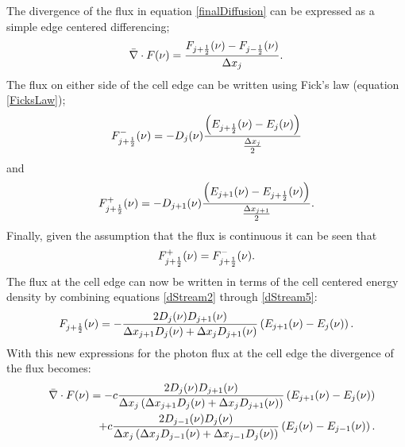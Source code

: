 	The divergence of the flux in equation \ref{finalDiffusion} can be expressed as a simple edge centered differencing;
	\begin{equation}
	\label{dStream}
	\bar{\nabla}\cdot{F(\nu)}={F_{j+{1\over{2}}}(\nu)-F_{j-{1\over{2}}}(\nu)\over{\Delta{x_j}}}.
	\end{equation}
	The flux on either side of the cell edge can be written using Fick's law (equation \ref{FicksLaw});
	\begin{equation}
	\label{dStream2}
	F_{j+{1\over{2}}}^-(\nu)=-D_{j}(\nu){\left(E_{j+{1\over{2}}}(\nu)-E_j(\nu)\right)\over{{\Delta{x_{j}}\over{2}}}}
	\end{equation}
	and
	\begin{equation}
	\label{dStream3}
	F_{j+{1\over{2}}}^+(\nu)=-D_{j+1}(\nu){\left(E_{j+1}(\nu)-E_{j+{1\over{2}}}(\nu)\right)\over{{\Delta{x_{j+1}}\over{2}}}}.
	\end{equation}
	Finally, given the assumption that the flux is continuous it can be seen that
	\begin{equation}
	\label{dStream5}
	F_{j+{1\over{2}}}^+(\nu)=F_{j+{1\over{2}}}^-(\nu).
	\end{equation}
	The flux at the cell edge can now be written in terms of the cell centered energy density by combining equations \ref{dStream2} through \ref{dStream5}: 
	\begin{equation}
	\label{dStream6}
	F_{j+{1\over{2}}}(\nu)=-{2D_j(\nu)D_{j+1}(\nu)\over{\Delta{x_{j+1}}D_j(\nu)+\Delta{x_{j}}D_{j+1}(\nu)}}\left(E_{j+1}(\nu)-E_{j}(\nu)\right).
	\end{equation}
	With this new expressions for the photon flux at the cell edge the divergence of the flux becomes:
	\begin{eqnarray}
	\label{dStream8}
	&&\bar{\nabla}\cdot{F(\nu)}=-c{2D_j(\nu)D_{j+1}(\nu)\over{\Delta{x_j}\left(\Delta{x_{j+1}}D_j(\nu)+\Delta{x_{j}}D_{j+1}(\nu)\right)}}\left(E_{j+1}(\nu)-E_{j}(\nu)\right)\nonumber \\ & & +c{2D_{j-1}(\nu)D_{j}(\nu)\over{\Delta{x_j}\left(\Delta{x_{j}}D_{j-1}(\nu)+\Delta{x_{j-1}}D_{j}(\nu)\right)}}\left(E_{j}(\nu)-E_{j-1}(\nu)\right).
	\end{eqnarray}
	
